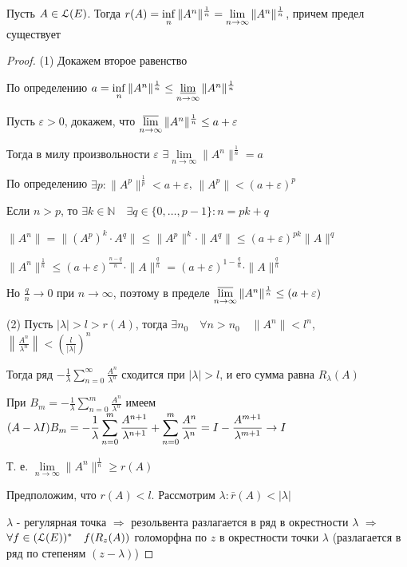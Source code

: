 \documentclass[a4paper,12pt]{report}
\newcommand*{\hm}[1]{#1\nobreak\discretionary{}%
            {\hbox{$\mathsurround=0pt #1$}}{}}
\begin{document}
\begin{thm}
Пусть $A\in\EuScript L(E)$. Тогда $r(A)\hm=\inf\limits_n\|A^n\|^{\frac1n}=\lim\limits_{n\to\infty}\|A^n\|^{\frac1n}$, причем предел существует
\end{thm}
\begin{proof}
(1) Докажем второе равенство

По определению $a=\inf\limits_n\|A^n\|^{\frac1n}\le\varliminf\limits_{n\to\infty}\|A^n\|^{\frac1n}$

Пусть $\varepsilon>0$, докажем, что $\varlimsup\limits_{n\to\infty}\|A^n\|^\frac1n\le a+\varepsilon$

Тогда в милу произвольности $\varepsilon$ $\exists\lim\limits_{n\to\infty}\|A^n\|^{\frac1n}=a$

По определению $\exists p\colon\|A^p\|^\frac1p<a+\varepsilon$, $\|A^p\|<(a+\varepsilon)^p$

Если $n>p$, то $\exists k\in\mathbb N\quad\exists q\in\{0,\ldots,p-1\}\colon n=pk+q$

$\|A^n\|=\|(A^p)^k\cdot A^q\|\le\|A^p\|^k\cdot\|A^q\|\le(a+\varepsilon)^{pk}\|A\|^q$

$\|A^n\|^\frac1n\le(a+\varepsilon)^\frac{n-q}{n}\cdot\|A\|^\frac{q}{n}=(a+\varepsilon)^{1-\frac{q}{n}}\cdot\|A\|^\frac{q}{n}$

Но $\frac{q}{n}\to0$ при $n\to\infty$, поэтому в пределе $\varlimsup\limits_{n\to\infty}\|A^n\|^\frac1n\le(a+\varepsilon)$

(2) Пусть $|\lambda|>l>r(A)$, тогда $\exists n_0\quad\forall n>n_0\quad\|A^n\|<l^n$,\\ $\left\|\displaystyle\frac{A^n}{\lambda^n}\right\|<\left(\displaystyle\frac{l}{|\lambda|}\right)^n$

Тогда ряд $-\displaystyle\frac1\lambda\sum\limits_{n=0}^\infty\displaystyle\frac{A^n}{\lambda^n}$ сходится при $|\lambda|>l$, и его сумма равна $R_\lambda(A)$

При $B_m=-\displaystyle\frac1\lambda\sum\limits_{n=0}^m\displaystyle\frac{A^n}{\lambda^n}$ имеем $(A-\lambda I)B_m=-\displaystyle\frac1\lambda\sum\limits_{n=0}^m\displaystyle\frac{A^{n+1}}{\lambda^{n+1}}+\sum\limits_{n=0}^m\displaystyle\frac{A^n}{\lambda^n}\hm=I-\displaystyle\frac{A^{m+1}}{\lambda^{m+1}}\to I$

Т. е. $\lim\limits_{n\to\infty}\|A^n\|^\frac1n\ge r(A)$

Предположим, что $r(A)<l$. Рассмотрим $\lambda\colon\bar r(A)<|\lambda|$

$\lambda$ - регулярная точка $\Rightarrow$ резольвента разлагается в ряд в окрестности $\lambda$ $\Rightarrow$ $\forall f\in(\EuScript L(E))^*\quad f(R_z(A))$ голоморфна по $z$ в окрестности точки $\lambda$ (разлагается в ряд по степеням $(z-\lambda)$)


\end{proof}
\end{document}
